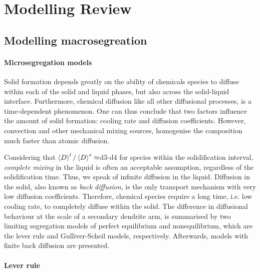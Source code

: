 \chapter{Modelling Review}
\begin{nolinkcolors} 
\minitoc
\end{nolinkcolors}
\newpage

\section{Modelling macrosegreation}
%
\subsubsection{Microsegregation models}
Solid formation depends greatly on the ability of chemicals species to diffuse within each of 
the solid and liquid phases, but also across the solid-liquid interface. Furthermore, chemical diffusion like all other 
diffusional processes, is a time-dependent phenomenon. One can thus conclude that two factors
influence the amount of solid formation: cooling rate and diffusion coefficients. However, 
convection and other mechanical mixing sources, homogenise the composition much faster than atomic diffusion. 

Considering that $\left \langle D \right \rangle^l/\left \langle D \right \rangle^s\approx$\num{d3}-\num{d4} for species within the solidification interval, \emph{complete mixing} in the liquid is often an acceptable assumption, regardless of the 
solidification time. Thus, we speak of infinite diffusion in the liquid. Diffusion in the solid, 
also known as \emph{back diffusion}, is the only transport mechanism with very low diffusion coefficients. 
Therefore, chemical species require a long time, i.e. low cooling rate, to completely diffuse within the solid.
The difference in diffusional behaviour at the scale of a secondary dendrite arm, is summarised by two limiting 
segregation models of perfect equilibrium  and nonequilibrium, which are the lever rule and Gulliver-Scheil models, respectively. 
Afterwards, models with finite back diffusion are presented. 

\subsubsection*{Lever rule}

